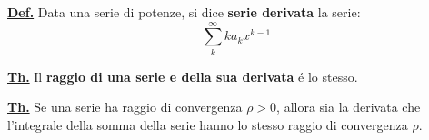 \documentclass[a4paper,10pt]{article} %
\renewcommand{\b}[1]{%
    {\textbf{#1}}}
\newcommand{\ldef}[1]{%
    {\smallbreak\par\tiny\textbf{\underline{Def.}} {#1} \smallbreak}}
\newcommand{\ltheorem}[1]{%
    {\smallbreak\par\tiny\textbf{\underline{Th.}} {#1} \smallbreak\par}}
\newcommand{\ldim}[1]{%
    {\smallbreak\par\tiny\emph{\textbf{Dimostrazione}} {#1} \par}}
\newcommand{\loss}[1]{%
    {\smallbreak\par\tiny\emph{\textbf{Osservazione}} {#1} \par}}
\renewcommand{\ldim}[1]{{}}
\begin{document}
\begin{multicols}{6}
\ldef{
    Data una serie di potenze, si dice \b{serie derivata } la serie:
    $$
    \sum_k^\infty k a_k x^{k-1}
    $$
}

\ltheorem{
    Il \b{raggio di una serie e della sua derivata} \'{e} lo stesso.
    \ldim{
        Consideriamo $\sum k a_k k^k = x \sum k a_k x^{k-1}$.
        Il raggio di convergenza di queste due serie \'{e} lo stesso poich\'{e} la parte indipendente da $x$ \'{e} la stessa. Confrontiamo $\sum k a_k x^k$ con $\sum a_k x^k$, usando il criterio della radice. Anche qui i due raggi di convergenza sono uguali poich\'{e} $\limsup_{k\to\infty} \sqrt[k]{|a_k|} = \limsup_{k\to\infty} \sqrt[k]{k|a_k|}$
    }
}

\ltheorem{
    Se una serie ha raggio di convergenza $ \rho > 0$, allora sia la derivata che l'integrale della somma della serie hanno lo stesso raggio di convergenza $\rho$.
}




\end{multicols}
\end{document}
